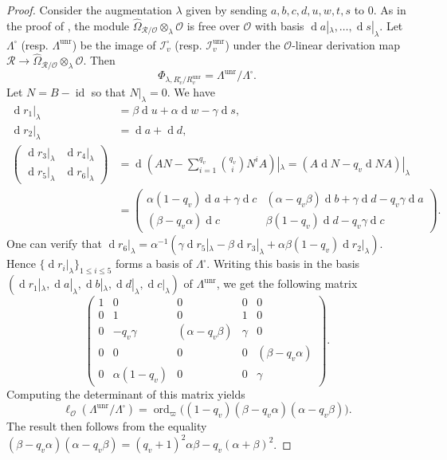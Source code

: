 \documentclass[a4paper, notitlepage, 10pt]{amsart}
\theoremstyle{plain} %
\theoremstyle{definition} %
\theoremstyle{remark} %
\numberwithin{equation}{section}
\newcommand{\dd}{\operatorname{d}} %
\newcommand{\id}{\operatorname{id}} %
\newcommand{\ord}{\operatorname{ord}} %
\newcommand{\unr}{\operatorname{unr}}
\begin{document}
\begin{proof}
     Consider the augmentation $\lambda$ given by sending $a,b,c,d,u,w,t,s$ to $0$. As in the proof of \cite[Proposition 7.9]{BKM1}, the module $\widehat{\Omega}_{\mathcal{R}/\mathcal{O}}\otimes_{\lambda}\mathcal{O}$ is free over $\mathcal{O}$ with basis $\dd a|_\lambda,\dots,\dd s|_{\lambda}$. Let $\Lambda^{\square}$ (resp. $\Lambda^{\unr}$) be the image of $\mathcal{I}^{\square}_v$ (resp. $\mathcal{I}^{\unr}_v$) under the $\mathcal{O}$-linear derivation map $\mathcal{R}\to \widehat{\Omega}_{\mathcal{R}/\mathcal{O}}\otimes_{\lambda}\mathcal{O}$. Then 
    $$ \Phi_{\lambda, R^{\square}_v/R^{\unr}_v}=\Lambda^{\unr}/\Lambda^{\square}. $$
     Let $N=B-\id$ so that $N|_\lambda=0$. We have
    \begin{align*}
        \dd r_1|_\lambda &=  \beta \dd u +\alpha \dd w - \gamma \dd s,
        \\ \dd r_2|_\lambda &=\dd a + \dd d,
        \\ \begin{pmatrix}
            \dd r_3|_\lambda & \dd r_4|_\lambda
            \\ \dd r_5|_\lambda & \dd r_6|_\lambda
        \end{pmatrix} &= \dd \left(AN- \sum_{i=1}^{q_v} \binom{q_v}{i} N^i A \right)|_\lambda =  (A \dd N - q_v \dd N A)|_\lambda
        \\ &=\begin{pmatrix}
            \alpha(1-q_v)\dd a + \gamma \dd c & (\alpha-q_v\beta)\dd b +\gamma \dd d -q_v\gamma \dd a 
            \\ (\beta-q_v\alpha) \dd c & \beta(1-q_v)\dd d - q_v\gamma \dd c
        \end{pmatrix}.
    \end{align*}
    One can verify that $\dd r_6|_\lambda= \alpha^{-1}(\gamma \dd r_5|_\lambda-\beta \dd r_3|_\lambda+ \alpha\beta(1-q_v)\dd r_2|_\lambda)$. Hence $\{\dd r_i|_\lambda\}_{1\le i \le 5}$ forms a basis of $\Lambda^{\square}$. Writing this basis in the basis $(\dd r_1|_\lambda,\dd a|_\lambda,\dd b|_\lambda, \dd d|_\lambda,\dd c|_\lambda)$ of $\Lambda^{\unr}$, we get the following matrix
       $$ \begin{pmatrix}
            1 & 0 & 0 & 0 & 0
            \\ 0 & 1 & 0 & 1 & 0
            \\ 0 & -q_v\gamma & (\alpha-q_v\beta) &  \gamma & 0
            \\ 0 & 0 & 0 & 0 & (\beta-q_v\alpha)
            \\ 0 & \alpha(1-q_v) & 0 & 0 & \gamma
        \end{pmatrix}.$$
        Computing the determinant of this matrix yields
        $$\ell_{\mathcal{O}} (\Lambda^{\unr}/\Lambda^{\square})=\ord_{\varpi}\big((1-q_v)(\beta-q_v\alpha)(\alpha-q_v\beta)\big).$$
   The result then follows from the equality $(\beta-q_v\alpha)(\alpha-q_v\beta)=(q_v+1)^2\alpha\beta-q_v(\alpha+\beta)^2$.
\end{proof}
\end{document}

